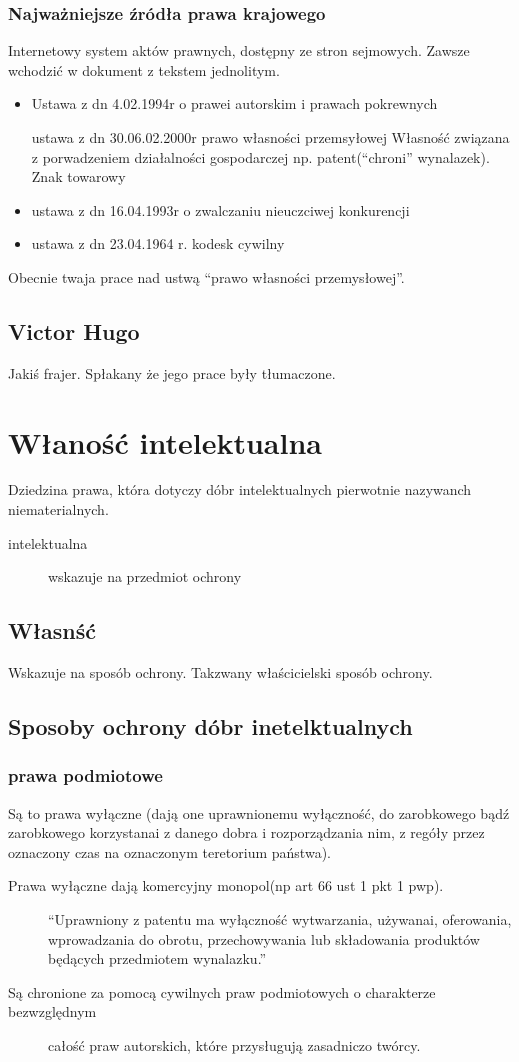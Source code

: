 \documentclass[11pt]{article}
\begin{document}
\subsubsection{Najważniejsze źródła prawa krajowego}
\label{sec:orge25d564}
Internetowy system aktów prawnych, dostępny ze stron sejmowych. Zawsze wchodzić w dokument z tekstem jednolitym.
\begin{itemize}
\item Ustawa z dn 4.02.1994r o prawei autorskim i prawach pokrewnych
\item[{ustawa z dn 30.06.02.2000r prawo własności przemsyłowej}] Własność związana z porwadzeniem działalności gospodarczej np. patent(``chroni'' wynalazek). Znak towarowy
\item ustawa z dn 16.04.1993r o zwalczaniu nieuczciwej konkurencji
\item ustawa z dn 23.04.1964 r. kodesk cywilny
\end{itemize}
Obecnie twaja prace nad ustwą ``prawo własności przemysłowej''.
\subsection{Victor Hugo}
\label{sec:orgd4671ac}
Jakiś frajer. Spłakany że jego prace były tłumaczone.
\section{Właność intelektualna}
\label{sec:orged20361}
Dziedzina prawa, która dotyczy dóbr intelektualnych pierwotnie nazywanch niematerialnych.
\begin{description}
\item[{intelektualna}] wskazuje na przedmiot ochrony
\end{description}
\subsection{Własnść}
\label{sec:org74d9bb7}
Wskazuje na sposób ochrony.
Takzwany właścicielski sposób ochrony.
\subsection{Sposoby ochrony dóbr inetelktualnych}
\label{sec:orgb0b8c2f}
\subsubsection{prawa podmiotowe}
\label{sec:org874e4f0}
Są to prawa wyłączne (dają one uprawnionemu wyłączność, do zarobkowego bądź zarobkowego korzystanai z danego dobra i rozporządzania nim, z regóły przez oznaczony czas na oznaczonym teretorium państwa).
\begin{description}
\item[{Prawa wyłączne dają komercyjny monopol(np art 66 ust 1 pkt 1 pwp).}] ``Uprawniony z patentu ma wyłączność wytwarzania, używanai, oferowania, wprowadzania do obrotu, przechowywania lub składowania produktów będących przedmiotem wynalazku.''
\item[{Są chronione za pomocą cywilnych praw podmiotowych o charakterze bezwzględnym}] całość praw autorskich, które przysługują zasadniczo twórcy.
\end{description}
\end{document}
